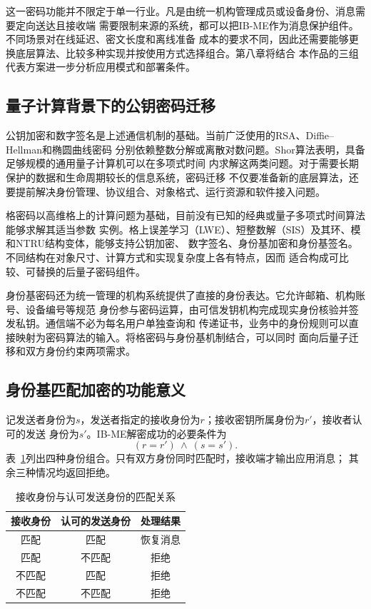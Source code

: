 这一密码功能并不限定于单一行业。凡是由统一机构管理成员或设备身份、消息需要定向送达且接收端
需要限制来源的系统，都可以把IB-ME作为消息保护组件。不同场景对在线延迟、密文长度和离线准备
成本的要求不同，因此还需要能够更换底层算法、比较多种实现并按使用方式选择组合。第八章将结合
本作品的三组代表方案进一步分析应用模式和部署条件。

\subsection{量子计算背景下的公钥密码迁移}

公钥加密和数字签名是上述通信机制的基础。当前广泛使用的RSA、Diffie--Hellman和椭圆曲线密码
分别依赖整数分解或离散对数问题。Shor算法表明，具备足够规模的通用量子计算机可以在多项式时间
内求解这两类问题\cite{shor1994}。对于需要长期保护的数据和生命周期较长的信息系统，密码迁移
不仅要准备新的底层算法，还要提前解决身份管理、协议组合、对象格式、运行资源和软件接入问题。

格密码以高维格上的计算问题为基础，目前没有已知的经典或量子多项式时间算法能够求解其适当参数
实例。格上误差学习（LWE）、短整数解（SIS）及其环、模和NTRU结构变体，能够支持公钥加密、
数字签名、身份基加密和身份基签名。不同结构在对象尺寸、计算方式和实现复杂度上各有特点，因而
适合构成可比较、可替换的后量子密码组件。

身份基密码还为统一管理的机构系统提供了直接的身份表达。它允许邮箱、机构账号、设备编号等规范
身份参与密码运算，由可信发钥机构完成现实身份核验并签发私钥。通信端不必为每名用户单独查询和
传递证书，业务中的身份规则可以直接映射为密码算法的输入。将格密码与身份基机制结合，可以同时
面向后量子迁移和双方身份约束两项需求。

\subsection{身份基匹配加密的功能意义}

记发送者身份为$s$，发送者指定的接收身份为$r$；接收密钥所属身份为$r'$，接收者认可的发送
身份为$s'$。IB-ME解密成功的必要条件为
\[
  (r=r')\ \land\ (s=s').
\]
表~\ref{tab:identity-cases}列出四种身份组合。只有双方身份同时匹配时，接收端才输出应用消息；
其余三种情况均返回拒绝。

\begin{table}[H]
\centering\small
\caption{接收身份与认可发送身份的匹配关系}
\label{tab:identity-cases}
\begin{tabular}{ccc}
\toprule
\rowcolor{black!8} 接收身份 & 认可的发送身份 & 处理结果 \\
\midrule
匹配 & 匹配 & 恢复消息 \\
匹配 & 不匹配 & 拒绝 \\
不匹配 & 匹配 & 拒绝 \\
不匹配 & 不匹配 & 拒绝 \\
\bottomrule
\end{tabular}
\end{table}

